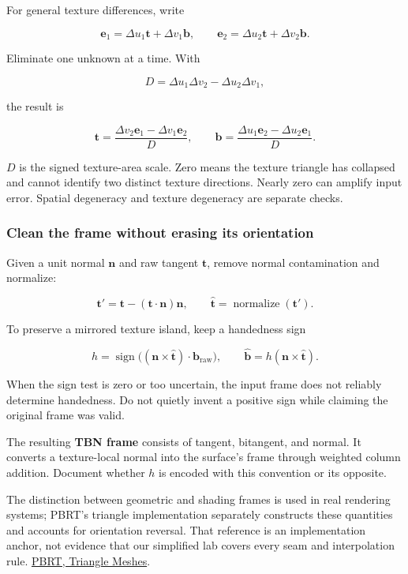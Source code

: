 For general texture differences, write

\[
\mathbf e_1=\Delta u_1\mathbf t+\Delta v_1\mathbf b,
\qquad
\mathbf e_2=\Delta u_2\mathbf t+\Delta v_2\mathbf b.
\]

Eliminate one unknown at a time. With

\[
D=\Delta u_1\Delta v_2-\Delta u_2\Delta v_1,
\]

the result is

\[
\mathbf t=\frac{\Delta v_2\mathbf e_1-\Delta v_1\mathbf e_2}{D},
\qquad
\mathbf b=\frac{\Delta u_1\mathbf e_2-\Delta u_2\mathbf e_1}{D}.
\]

\(D\) is the signed texture-area scale. Zero means the texture triangle has collapsed and cannot identify two distinct texture directions. Nearly zero can amplify input error. Spatial degeneracy and texture degeneracy are separate checks.

\subsubsection{Clean the frame without erasing its orientation}\label{01-foundations-i-ch017-clean-the-frame-without-erasing-its-orientation}

\hypertarget{01-foundations-i-ch017-clean-the-frame-without-erasing-its-orientation}{}

Given a unit normal \(\mathbf n\) and raw tangent \(\mathbf t\), remove normal contamination and normalize:

\[
\mathbf t'=\mathbf t-(\mathbf t\cdot\mathbf n)\mathbf n,
\qquad \widehat{\mathbf t}=\operatorname{normalize}(\mathbf t').
\]

To preserve a mirrored texture island, keep a handedness sign

\[
h=\operatorname{sign}\big((\mathbf n\times\widehat{\mathbf t})\cdot\mathbf b_{\mathrm{raw}}\big),
\qquad
\widehat{\mathbf b}=h(\mathbf n\times\widehat{\mathbf t}).
\]

When the sign test is zero or too uncertain, the input frame does not reliably determine handedness. Do not quietly invent a positive sign while claiming the original frame was valid.

The resulting \textbf{TBN frame} consists of tangent, bitangent, and normal. It converts a texture-local normal into the surface's frame through weighted column addition. Document whether \(h\) is encoded with this convention or its opposite.

The distinction between geometric and shading frames is used in real rendering systems; PBRT's triangle implementation separately constructs these quantities and accounts for orientation reversal. That reference is an implementation anchor, not evidence that our simplified lab covers every seam and interpolation rule. \href{https://www.pbr-book.org/4ed/Shapes/Triangle_Meshes}{PBRT, Triangle Meshes}.

